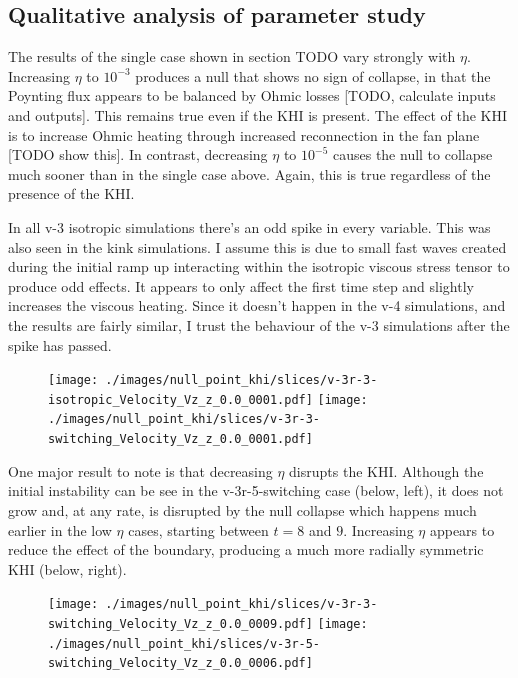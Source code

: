\subsection{Qualitative analysis of parameter study}

The results of the single case shown in section TODO vary strongly with $\eta$. Increasing $\eta$ to $10^{-3}$ produces a null that shows no sign of collapse, in that the Poynting flux appears to be balanced by Ohmic losses [TODO, calculate inputs and outputs]. This remains true even if the KHI is present. The effect of the KHI is to increase Ohmic heating through increased reconnection in the fan plane [TODO show this]. In contrast, decreasing $\eta$ to $10^{-5}$ causes the null to collapse much sooner than in the single case above. Again, this is true regardless of the presence of the KHI.

In all v-3 isotropic simulations there's an odd spike in every variable. This was also seen in the kink simulations. I assume this is due to small fast waves created during the initial ramp up interacting within the isotropic viscous stress tensor to produce odd effects. It appears to only affect the first time step and slightly increases the viscous heating. Since it doesn't happen in the v-4 simulations, and the results are fairly similar, I trust the behaviour of the v-3 simulations after the spike has passed.

\begin{figure}[H]
  \centering
  \texttt{[image: ./images/null\_point\_khi/slices/v-3r-3-isotropic\_Velocity\_Vz\_z\_0.0\_0001.pdf]}
  \texttt{[image: ./images/null\_point\_khi/slices/v-3r-3-switching\_Velocity\_Vz\_z\_0.0\_0001.pdf]}
\end{figure}

One major result to note is that decreasing $\eta$ disrupts the KHI. Although the initial instability can be see in the v-3r-5-switching case (below, left), it does not grow and, at any rate, is disrupted by the null collapse which happens much earlier in the low $\eta$ cases, starting between $t=8$ and $9$. Increasing $\eta$ appears to reduce the effect of the boundary, producing a much more radially symmetric KHI (below, right).

\begin{figure}[H]
  \centering
  \texttt{[image: ./images/null\_point\_khi/slices/v-3r-3-switching\_Velocity\_Vz\_z\_0.0\_0009.pdf]}
  \texttt{[image: ./images/null\_point\_khi/slices/v-3r-5-switching\_Velocity\_Vz\_z\_0.0\_0006.pdf]}
\end{figure}


